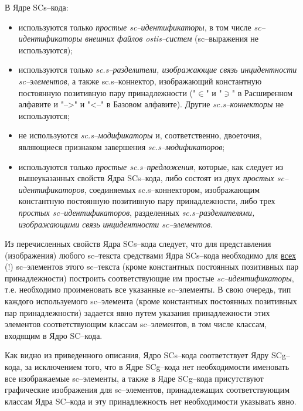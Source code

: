 В Ядре SCs--кода:
\begin{itemize}
	\item используются только \textit{простые sc--идентификаторы}, в том числе \textit{sc--идентификаторы внешних файлов ostis--систем} (sc--выражения не используются);
	\item используются только \textit{sc.s--разделители, изображающие связь инцидентности sc--элементов}, а также sc.s--коннектор, изображающий константную  постоянную позитивную пару принадлежности ("$\in$"{} и "$\ni$"{} в Расширенном алфавите и "{}-->{}"{} и "{}<--{}"{} в Базовом алфавите). Другие \textit{sc.s--коннекторы} не используются;
	\item не используются \textit{sc.s--модификаторы} и, соответственно, двоеточия, являющиеся признаком завершения \textit{sc.s--модификаторов};
	\item используются только \textit{простые sc.s--предложения}, которые, как следует из вышеуказанных свойств Ядра SCs--кода, либо состоят из двух \textit{простых sc--идентификаторов}, соединяемых sc.s--коннектором, изображающим константную  постоянную позитивную пару принадлежности, либо трех \textit{простых sc--идентификаторов}, разделенных \textit{sc.s--разделителями, изображающими связь инцидентности sc--элементов}.
\end{itemize}


Из перечисленных свойств Ядра SCs--кода следует, что для представления (изображения) любого \mbox{sc--текста} средствами Ядра SCs--кода необходимо для \uline{всех} (!) sc--элементов этого \mbox{sc--текста} (кроме константных постоянных позитивных пар принадлежности) построить соответствующие им простые \textit{sc--идентификаторы}, т.е. необходимо проименовать все указанные sc--элементы. В свою очередь, тип каждого используемого \mbox{sc--элемента} (кроме константных постоянных позитивных пар принадлежности) задается явно путем указания принадлежности этих элементов соответствующим классам sc--элементов, в том числе классам, входящим в Ядро SC--кода.

Как видно из приведенного описания, Ядро SCs--кода соответствует Ядру SCg--кода, за исключением того, что в Ядре SCg--кода нет необходимости именовать все изображаемые sc--элементы, а также в Ядре SCg--кода присутствуют графические изображения для sc--элементов, принадлежащих соответствующим классам Ядра SC--кода и эту принадлежность нет необходимости указывать явно.

